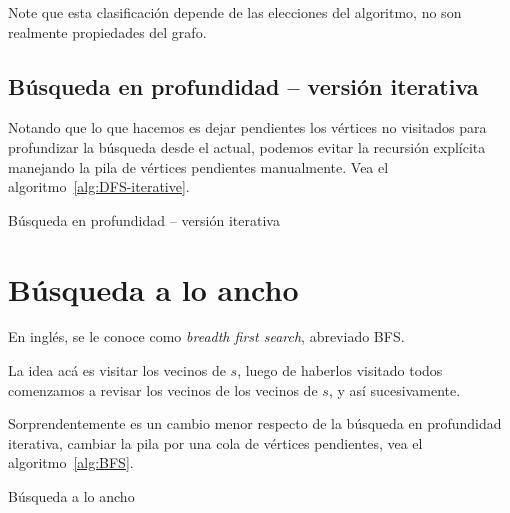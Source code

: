   Note que esta clasificación depende de las elecciones del algoritmo,
  no son realmente propiedades del grafo.

\subsection{Búsqueda en profundidad -- versión iterativa}
\label{sec:DFS-iterative}

  Notando que lo que hacemos es dejar pendientes los vértices no visitados
  para profundizar la búsqueda desde el actual,
  podemos evitar la recursión explícita
  manejando la pila de vértices pendientes manualmente.
  Vea el algoritmo~\ref{alg:DFS-iterative}.
  \begin{algorithm}[ht]
    \DontPrintSemicolon

    \caption{Búsqueda en profundidad -- versión iterativa}
    \label{alg:DFS-iterative}
  \end{algorithm}

\section{Búsqueda a lo ancho}
\label{sec:BFS}

  En inglés,
  se le conoce como \emph{\foreignlanguage{english}{breadth first search}},
  abreviado BFS.

  La idea acá es visitar los vecinos de \(s\),
  luego de haberlos visitado todos
  comenzamos a revisar los vecinos de los vecinos de \(s\),
  y así sucesivamente.

  Sorprendentemente es un cambio menor
  respecto de la búsqueda en profundidad iterativa,
  cambiar la pila por una cola de vértices pendientes,
  vea el algoritmo~\ref{alg:BFS}.
  \begin{algorithm}[ht]
    \DontPrintSemicolon

    \caption{Búsqueda a lo ancho}
    \label{alg:BFS}
  \end{algorithm}

